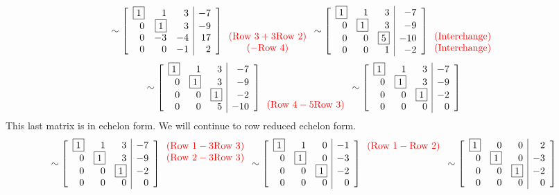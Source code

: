 \begin{Exam}
\[\sim  \mtx{rrr|r}{\fbox{1}&1&3&-7\\0&\fbox{1}&3&-9\\0&-3&-4&17\\0&0&-1&2}{\color{red}\begin{array}{c} \mbox{}\\ \mbox{} \\ (\text{Row 3} + 3\text{Row 2}) \\ (-\text{Row 4})\end{array}} 
\sim  \mtx{rrr|r}{\fbox{1}&1&3&-7\\0&\fbox{1}&3&-9\\0&0&\fbox{5}&-10\\0&0&1&-2}{\color{red}\begin{array}{c} \mbox{}\\ \mbox{} \\ (\text{Interchange}) \\ (\text{Interchange})\end{array}} \]
\[\sim  \mtx{rrr|r}{\fbox{1}&1&3&-7\\0&\fbox{1}&3&-9\\0&0&\fbox{1}&-2\\0&0&5&-10}{\color{red}\begin{array}{c} \mbox{}\\ \mbox{} \\ \mbox{} \\ (\text{Row 4} - 5\text{Row 3})\end{array}}
\sim  \mtx{rrr|r}{\fbox{1}&1&3&-7\\0&\fbox{1}&3&-9\\0&0&\fbox{1}&-2\\0&0&0&0}
\]  This last matrix is in echelon form. We will continue to row reduced echelon form. 
\[\sim  \mtx{rrr|r}{\fbox{1}&1&3&-7\\0&\fbox{1}&3&-9\\0&0&\fbox{1}&-2\\0&0&0&0}{\color{red} \begin{array}{c} (\text{Row 1} - 3\text{Row 3})\\  (\text{Row 2} - 3\text{Row 3}) \\ \mbox{} \\ \mbox{}\end{array}} \sim  \mtx{rrr|r}{\fbox{1}&1&0&-1\\0&\fbox{1}&0&-3\\0&0&\fbox{1}&-2\\0&0&0&0}{\color{red} \begin{array}{c} (\text{Row 1} - \text{Row 2})\\  \mbox{} \\ \mbox{} \\ \mbox{}\end{array}} \sim \mtx{rrr|r}{\fbox{1}&0&0&2\\0&\fbox{1}&0&-3\\0&0&\fbox{1}&-2\\0&0&0&0}
\]
\end{Exam}

